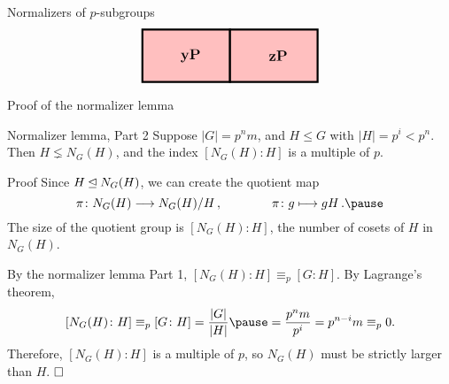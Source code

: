 \documentclass[8pt, handout]{beamer}
\newcommand{\Pause}{\pause}      %
\begin{document}
\begin{frame}{Normalizers of $p$-subgroups}
\[\begin{tikzpicture}[scale=.5]
\begin{scope}[shift={(12.5,0)}]
\begin{scope}[shift={(5,0)}]
      \end{scope}
      \begin{scope}[shift={(0,-3)}]
        \draw[color=boxRed,fill=boxRed] (0,0) rectangle (5,3);
        \draw[ultra thick] (0,0) rectangle (5,3);
        \node at (2.75,1.5) {\large\bf $\mathbf{yP}$};
      \end{scope}
      \begin{scope}[shift={(5,-3)}]
        \draw[color=boxRed,fill=boxRed] (0,0) rectangle (5,3);
        \draw[ultra thick] (0,0) rectangle (5,3);
        \node at (2.75,1.5) {\large\bf $\mathbf{zP}$};
      \end{scope}
    \end{scope}
  \end{tikzpicture}
  \]
  
\end{frame}


\begin{frame}{Proof of the normalizer lemma}

  \begin{block}{Normalizer lemma, Part 2} 
    Suppose $|G|=p^nm$, and $H\leq G$ with $|H|=p^i<p^n$. Then $H\lneq
    N_G(H)$, and the index $[N_G(H):H]$ is a multiple of $p$. 
  \end{block}

  \begin{exampleblock}{Proof} 
    Since $H\unlhd N_G(H)$, we can create the quotient map 
    \[
    \pi\colon N_G(H)\longrightarrow N_G(H)/H\,,\qquad\qquad \pi\colon
    g\longmapsto gH\,. \Pause
    \]
    The size of the quotient group is $[N_G(H)\colon H]$, the number of
    cosets of $H$ in $N_G(H)$.
    
    \pause\bigskip
    
    By the normalizer lemma Part 1, $[N_G(H)\colon H]\equiv_p[G\colon
      H]$. \Pause By Lagrange's theorem, %
    \[
    [N_G(H)\colon H]\equiv_p[G\colon
      H]=\frac{|G|}{|H|}\Pause=\frac{p^nm}{p^i}=p^{n-i}m\equiv_p 0.
    \]
    \pause Therefore, $[N_G(H)\colon H]$ is a multiple of $p$, so $N_G(H)$
    must be strictly larger than $H$. $\hfill\Box$
  \end{exampleblock}
  
\end{frame}

\end{document}
